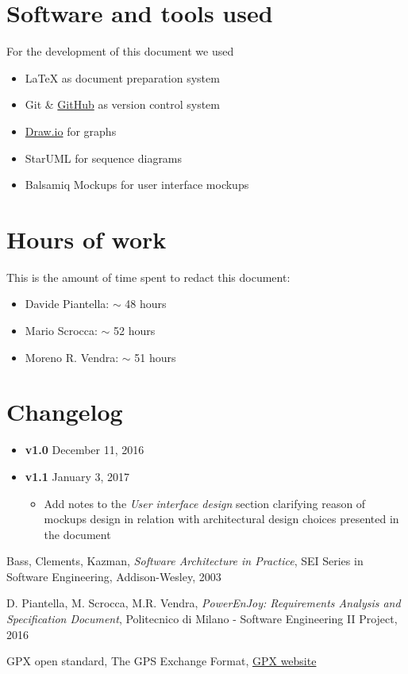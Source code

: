 \begin{appendices}

	\section{Software and tools used}
	For the development of this document we used
	\begin{itemize}
		\item \LaTeX{} as document preparation system
		\item Git \& \href{http://github.com}{GitHub} as version control system
		\item \href{http://draw.io}{Draw.io} for graphs 
		\item StarUML for sequence diagrams
		\item Balsamiq Mockups for user interface mockups
	\end{itemize}
	
	\section{Hours of work}
	This is the amount of time spent to redact this document:
	\begin{itemize}
		\item Davide Piantella: $\sim$ 48 hours
		\item Mario Scrocca: $\sim$ 52 hours
		\item Moreno R. Vendra: $\sim$ 51 hours
	\end{itemize}
	
		\section{Changelog}
	\begin{itemize}
		\item \textbf{v1.0} December 11, 2016
		\item \textbf{v1.1} January 3, 2017
		\begin{itemize}
			\item Add notes to the \emph{User interface design} section clarifying reason of mockups design in relation with architectural design choices presented in the document
		\end{itemize}
	\end{itemize}
	
\end{appendices}


\begin{thebibliography}{9}

Bass, Clements, Kazman, \emph{Software Architecture in Practice}, SEI Series in Software Engineering, Addison-­Wesley, 2003

D. Piantella, M. Scrocca, M.R. Vendra, \emph{PowerEnJoy: Requirements Analysis and Specification Document}, Politecnico di Milano - Software Engineering II Project, 2016

GPX open standard, The GPS Exchange Format, \href{http://www.topografix.com/gpx.asp}{GPX website}
\end{thebibliography}